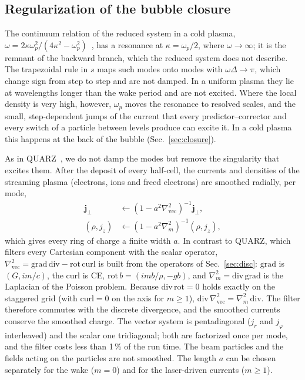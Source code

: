 \documentclass[preprint,12pt]{elsarticle}
\begin{document}
\subsection{Regularization of the bubble closure}\label{sec:smooth}

The continuum relation of the reduced system in a cold plasma, $\omega = 2\kappa\omega_p^2/(4\kappa^2 - \omega_p^2)$~\cite{GEMPIC}, has a resonance at $\kappa = \omega_p/2$, where $\omega \to \infty$; it is the remnant of the backward branch, which the reduced system does not describe. The trapezoidal rule in $s$ maps such modes onto modes with $\omega\Delta \to \pi$, which change sign from step to step and are not damped. In a uniform plasma they lie at wavelengths longer than the wake period and are not excited. Where the local density is very high, however, $\omega_p$ moves the resonance to resolved scales, and the small, step-dependent jumps of the current that every predictor--corrector and every switch of a particle between levels produce can excite it. In a cold plasma this happens at the back of the bubble (Sec.~\ref{sec:closure}).

As in QUARZ~\cite{QUARZ}, we do not damp the modes but remove the singularity that excites them. After the deposit of every half-cell, the currents and densities of the streaming plasma (electrons, ions and freed electrons) are smoothed radially, per mode,
\begin{align}
\bm j_\perp &\leftarrow (1 - a^2\nabla^2_\mathrm{vec})^{-1}\bm j_\perp, \nonumber\\
(\rho, j_z) &\leftarrow (1 - a^2\nabla^2_m)^{-1}(\rho, j_z), \label{eq:smooth}
\end{align}
which gives every ring of charge a finite width $a$. In contrast to QUARZ, which filters every Cartesian component with the scalar operator, $\nabla^2_\mathrm{vec} = \mathrm{grad}\,\mathrm{div} - \mathrm{rot}\,\mathrm{curl}$ is built from the operators of Sec.~\ref{sec:disc}: $\mathrm{grad}$ is $(G, im/c)$, the curl is CE, $\mathrm{rot}\,b = (im b/\rho, -g b)$, and $\nabla^2_m = \mathrm{div}\,\mathrm{grad}$ is the Laplacian of the Poisson problem. Because $\mathrm{div}\,\mathrm{rot} = 0$ holds exactly on the staggered grid (with $\mathrm{curl} = 0$ on the axis for $m \ge 1$), $\mathrm{div}\,\nabla^2_\mathrm{vec} = \nabla^2_m\,\mathrm{div}$. The filter therefore commutes with the discrete divergence, and the smoothed currents conserve the smoothed charge. The vector system is pentadiagonal ($j_r$ and $j_\varphi$ interleaved) and the scalar one tridiagonal; both are factorized once per mode, and the filter costs less than 1\,\% of the run time. The beam particles and the fields acting on the particles are not smoothed. The length $a$ can be chosen separately for the wake ($m = 0$) and for the laser-driven currents ($m \ge 1$).
\end{document}
